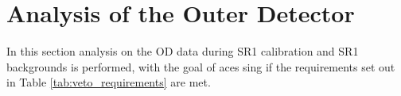 \chapter{Analysis of the Outer Detector} \label{chap:analysis_of_the_od}

In this section analysis on the OD data during SR1 calibration and SR1 backgrounds is performed, with the goal of aces sing if the requirements set out in Table \ref{tab:veto_requirements} are met.







